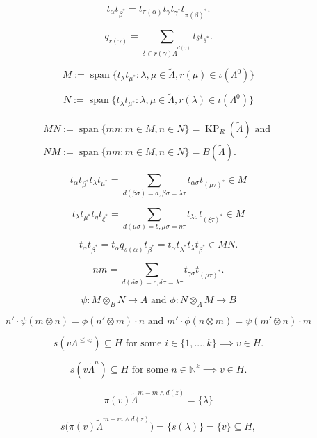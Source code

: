 \documentclass[a4paper,12pt]{article}
\begin{document}
\begin{equation}\label{eq:talphatbeta*}
t_{\alpha}t_{\beta^*} = t_{\pi(\alpha)}t_{\gamma}t_{\gamma^*}t_{\pi(\beta)^*}.
\end{equation}

\[q_{r(\gamma) } = \sum_{\delta \in r(\gamma)  {\tilde{\Lambda}}^{d(\gamma)}} t_{\delta}t_{\delta^*}.\]

\[M := {\operatorname{\mathrm{span}}}\{t_{\lambda}t_{\mu^*} : \lambda, \mu \in \tilde{\Lambda}, r(\mu)\in \iota(\Lambda^0)\}\]

\[N := {\operatorname{\mathrm{span}}}\{t_{\lambda}t_{\mu^*} : \lambda, \mu \in \tilde{\Lambda}, r(\lambda)\in \iota(\Lambda^0)\}\]

\begin{gather*}
MN:={\operatorname{\mathrm{span}}}\{mn:m\in M, n\in N\}=\operatorname{KP}_R(\tilde\Lambda)\text{\ and\ } \\NM:={\operatorname{\mathrm{span}}}\{nm:m\in M, n\in N\}=B(\tilde\Lambda).
\end{gather*}

\[
t_\alpha t_{\beta^*}t_{\lambda}t_{\mu^*}=\sum_{d(\beta\sigma)=a,\beta\sigma=\lambda\tau} t_{\alpha\sigma}t_{(\mu\tau)^*}\in M
\]

\[
t_{\lambda}t_{\mu^*}t_\eta t_{\xi^*}=\sum_{d(\mu\sigma)=b,\mu\sigma=\eta\tau}t_{\lambda\sigma}t_{(\xi\tau)^*}\in M
\]

\[
t_\alpha t_{\beta^*} = t_\alpha q_{s(\alpha)} t_{\beta^*}=t_\alpha t_{\lambda^*} t_\lambda t_{\beta^*} \in MN.
\]

\[
nm=\sum_{d(\delta\sigma)=c,\delta\sigma=\lambda\tau} t_{\gamma\sigma}t_{(\mu\tau)^*}.
\]

\[
     \psi:M \otimes_B N \to A \text{ and }\phi:N \otimes_A M \to B
\]

\begin{equation}\label{eq-ops}n'\cdot \psi(m \otimes n) = \phi(n' \otimes m)\cdot n \text { and } m'\cdot \phi(n \otimes m) = \psi(
m' \otimes n)\cdot m\end{equation}

\[s(v\Lambda^{\leq e_i}) \subseteq H \text{ for some } i \in \{1, ..., k\} \implies
 v \in H.
\]

\[s(v{\tilde{\Lambda}}^{n}) \subseteq H \text{ for some } n \in {\mathbb{N}}^k \implies
 v \in H.
\]

\[\pi(v){\tilde{\Lambda}}^{m-m\wedge d(z)} = \{\lambda\}\]

\[
                  s\big(\pi(v){\tilde{\Lambda}}^{m-m\wedge d(z)}\big) = \{s(\lambda)\} = \{v\} \subseteq H,
                 \]
\end{document}
